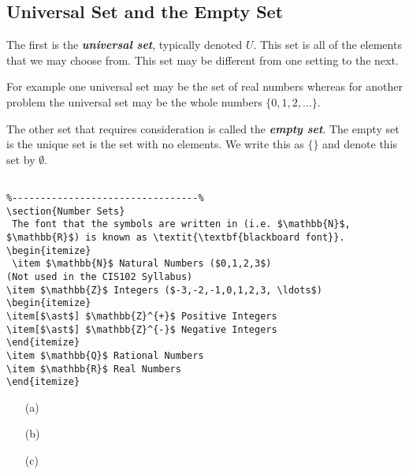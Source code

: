 \documentclass[MASTER.tex]{subfiles}
\begin{document}
\subsection{Universal Set and the Empty Set}
The first is the \textbf{\textit{universal set}}, typically denoted $U$. This set is all of the elements that we may choose from. This set may be different from one setting to the next. 

For example one universal set may be the set of real numbers whereas for another problem the universal set may be the whole numbers $\{0, 1, 2,\ldots\}$.

The other set that requires consideration is called the \textit{\textbf{empty set}}. The empty set is the unique set is the set with no elements. We write this as $\{ \}$ and denote this set by $\emptyset$.

\begin{verbatim}

%---------------------------------%
\section{Number Sets}
 The font that the symbols are written in (i.e. $\mathbb{N}$, $\mathbb{R}$) is known as \textit{\textbf{blackboard font}}.
\begin{itemize}
 \item $\mathbb{N}$ Natural Numbers ($0,1,2,3$) 
(Not used in the CIS102 Syllabus)
\item $\mathbb{Z}$ Integers ($-3,-2,-1,0,1,2,3, \ldots$)
\begin{itemize}
\item[$\ast$] $\mathbb{Z}^{+}$ Positive Integers
\item[$\ast$] $\mathbb{Z}^{-}$ Negative Integers
\end{itemize}
\item $\mathbb{Q}$ Rational Numbers
\item $\mathbb{R}$ Real Numbers
\end{itemize}
\end{verbatim}
\begin{itemize}

\item[(a)] 

\item[(b)]

\item[(c)]

\end{itemize}
\end{document}
